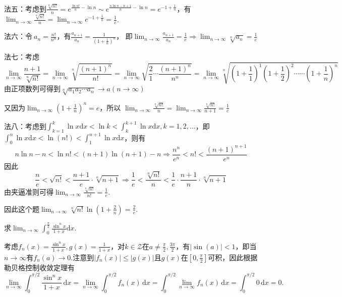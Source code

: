 \begin{xiti}
\begin{solution}
\begin{enumerate}
	法五：考虑到$\frac{\sqrt[n]{n!}}{n}=e^{\frac{\ln n!}{n}-\ln n}\sim e^{\frac{n\ln n-n+1}{n}-\ln n}=e^{-1+\frac{1}{n}}$，有$\lim_{n\rightarrow\infty}\frac{\sqrt[n]{n!}}{n}=\lim_{n\rightarrow\infty}e^{-1+\frac{1}{n}}=\frac{1}{e}$.
	
	法六：令$\ a_n=\frac{n!}{n^n}$，有$\frac{a_{n+1}}{a_n}=\frac{1}{\left(1+\frac{1}{n}\right)^n}
	$，
	即$\lim_{n\rightarrow\infty}\frac{a_{n+1}}{a_n}=\frac{1}{e}\Rightarrow \lim_{n\rightarrow\infty}\sqrt[n]{a_n}=\frac{1}{e}$
	
	法七：考虑
	\[
	\lim_{n\rightarrow\infty}\frac{n+1}{\sqrt[n]{n!}}=\lim_{n\rightarrow\infty}\sqrt[n]{\frac{\left(n+1\right)^n}{n!}}=\lim_{n\rightarrow\infty}\sqrt{\frac{2}{1}\cdots\frac{\left(n+1\right)^n}{n^n}}=\lim_{n\rightarrow\infty}\sqrt[n]{\left(1+\frac{1}{1}\right)^1\left(1+\frac{1}{2}\right)^2\cdots\cdots\left(1+\frac{1}{n}\right)^n}
	\]
	由正项数列可得到$\sqrt[n]{a_1a_2\cdots a_n}\longrightarrow a\left(n\rightarrow\infty\right)$
	
	又因为$\lim_{n\rightarrow\infty}\left(1+\frac{1}{n}\right)^n=e$，所以
	$
	\lim_{n\rightarrow\infty}\frac{\sqrt[n]{n!}}{n}=\lim_{n\rightarrow\infty}\frac{\sqrt[n]{n!}}{n+1}=\frac{1}{e}
	$
	
	法八：考虑到$
	\int_{k=1}^{k} \ln x \mathrm { d } x<\ln k<\int_{k}^{k+1} \ln x \mathrm { d }x,  k=1,2, \ldots$，即$\int_{0}^{n} \ln x \mathrm { d } x<\ln (n !)<\int_{1}^{n+1} \ln x \mathrm { d } x$，则有
	\[
	n \ln n-n<\ln n !<(n+1) \ln (n+1)-n\Rightarrow
	\frac{n^{n}}{e^{n}}<n !<\frac{(n+1)^{n+1}}{e^{n}}
	\]
	因此
	\[
	\frac{n}{e}<\sqrt{n !}<\frac{n+1}{e} \cdot \sqrt[n]{n+1}\Rightarrow\frac{1}{e}<\frac{\sqrt[n]{n !}}{n}<\frac{1}{e} \cdot \frac{n+1}{n} \cdot \sqrt[n]{n+1}
	\]
	由夹逼准则可得$\lim _{n \rightarrow \infty} \frac{\sqrt[n]{n !}}{n !}=\frac{1}{e}$.
	\end{enumerate}
\end{solution}
\begin{note}
	因此这个题$\lim _ { n \rightarrow \infty } \sqrt [ n ] { n ! } \ln \left( 1 + \frac { 2 } { n } \right)=\frac{2}{e}$.
\end{note}
\item 求$\lim _ { n \rightarrow \infty } \int _ { 0 } ^ { \frac { \pi } { 2 } } \frac { \sin ^ { n } x } { 1 + x } \mathrm { d } x$.
\begin{solution}
	考虑$f_n\left(x\right)=\frac{\sin^nx}{1+x},g\left(x\right)=\frac{1}{1+x}$，对$k\in \mathcal{Z}$在$a\ne \frac{\pi}{2},\frac{3\pi}{2}$，有$|\sin(a)| < 1$，即当$n\rightarrow \infty$有$f_n (a) \to 0$.注意到$|f_n (x)| \le |g(x)|$且$g(x)$在$[0,\frac{\pi}{2}]$可积，因此根据勒贝格控制收敛定理有
	\[
	\lim_{n\rightarrow\infty}\int_0^{\pi/2}{\frac{\sin^nx}{1+x}}\,\mathrm { d }x=\lim_{n\rightarrow\infty}\int_0^{\pi/2}{f_n}\left(x\right)\,\mathrm { d }x=\int_0^{\pi/2}{\lim_{n\rightarrow\infty}}f_n\left(x\right)\,\mathrm { d }x=\int_0^{\pi/2}{0}\,\mathrm { d }x=0.
	\]
	

\end{solution}
\end{xiti}
